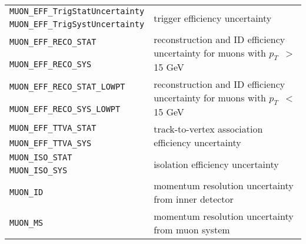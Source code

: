 \begin{table}
{\begin{tabular}{ll}
  \texttt{MUON\_EFF\_TrigStatUncertainty} &  \multirow{2}{*}{trigger efficiency uncertainty} \\%
  \texttt{MUON\_EFF\_TrigSystUncertainty} & \\%
  \texttt{MUON\_EFF\_RECO\_STAT} &  \multirow{2}{*}{reconstruction and ID efficiency uncertainty for muons with $p_T$\ $>$ 15 GeV} \\%
  \texttt{MUON\_EFF\_RECO\_SYS} &  \\%
  \texttt{MUON\_EFF\_RECO\_STAT\_LOWPT} & \multirow{2}{*}{reconstruction and ID efficiency uncertainty for muons with $p_T$\ $<$ 15 GeV} \\%
  \texttt{MUON\_EFF\_RECO\_SYS\_LOWPT} &  \\%
  \texttt{MUON\_EFF\_TTVA\_STAT}\footnotemark[10] &  \multirow{2}{*}{track-to-vertex association efficiency uncertainty} \\%
  \texttt{MUON\_EFF\_TTVA\_SYS}\footnotemark[10] &                      \\%
  \texttt{MUON\_ISO\_STAT} &  \multirow{2}{*}{isolation efficiency uncertainty} \\%
  \texttt{MUON\_ISO\_SYS} &                     \\%
  \texttt{MUON\_ID} & momentum resolution uncertainty from inner detector        \\%
  \texttt{MUON\_MS} &  momentum resolution uncertainty from muon system        \\%

\end{tabular}}
\end{table}

